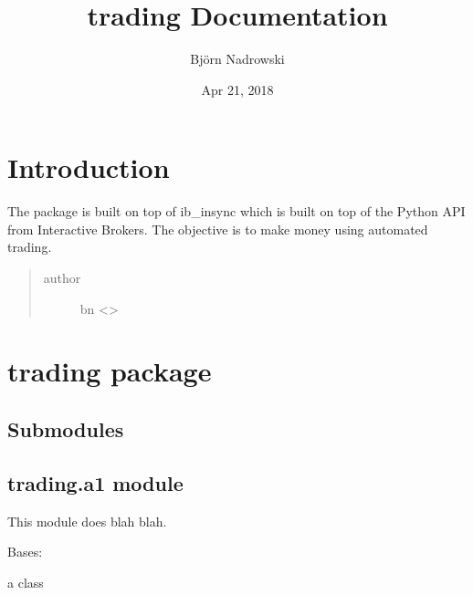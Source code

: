 \documentclass[letterpaper,10pt,english]{sphinxmanual}
\title{trading Documentation}
\date{Apr 21, 2018}
\author{Björn Nadrowski}
\begin{document}
\maketitle
\sphinxtableofcontents
{}\label{\detokenize{index::doc}}


 


\chapter{Introduction}
\label{\detokenize{readme:contents}}\label{\detokenize{readme:introduction}}\label{\detokenize{readme::doc}}
The  package is built on top of ib\_insync which is built on
top of the Python API from Interactive Brokers. The objective is to make
money using automated trading.
\begin{quote}\begin{description}
\item[{author}] \leavevmode
bn \textless{}\textgreater{}

\end{description}\end{quote}


\chapter{trading package}
\label{\detokenize{trading::doc}}\label{\detokenize{trading:trading-package}}

\section{Submodules}
\label{\detokenize{trading:submodules}}

\section{trading.a1 module}
\label{\detokenize{trading:module-trading.a1}}\label{\detokenize{trading:trading-a1-module}}
This module does blah blah.

\begin{fulllineitems}
\label{\detokenize{trading:trading.a1.MyClass}}
Bases: 

a class

\end{fulllineitems}
\end{document}
